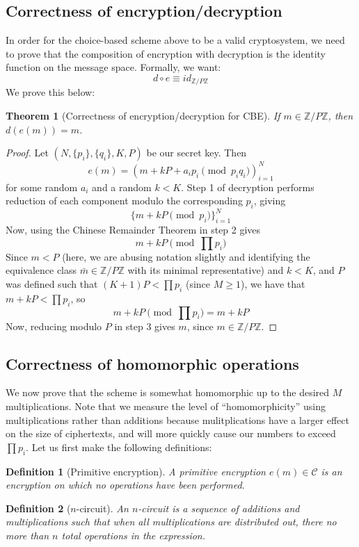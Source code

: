 \documentclass[11pt]{report}
\newtheorem{thm}{Theorem}
\newtheorem{definition}{Definition}
\newcommand{\ZP}{\mathbb{Z}/P\mathbb{Z}}
\begin{document}
\subsection{Correctness of encryption/decryption}

In order for the choice-based scheme above to be a valid cryptosystem, we need to prove that the composition of encryption with decryption is the identity function on the message space. Formally, we want: \[d\circ e \equiv id_{\ZP}\] We prove this below:

\begin{thm}[Correctness of encryption/decryption for CBE]
If $m\in\ZP$, then $d(e(m)) = m$.
\end{thm}

\begin{proof}
Let $(N,\{p_i\},\{q_i\},K,P)$ be our secret key. Then
\[e(m) = (m+kP+a_ip_i \pmod{p_iq_i})_{i=1}^N\]
for some random $a_i$ and a random $k<K$. Step 1 of decryption performs reduction of each component modulo the corresponding $p_i$, giving
\[\{m+kP \pmod{p_i}\}_{i=1}^N \]
Now, using the Chinese Remainder Theorem in step 2 gives
\[ m+kP \pmod{\prod p_i} \]
Since $m<P$ (here, we are abusing notation slightly and identifying the equivalence class $\bar{m} \in \ZP$ with its minimal representative) and $k<K$, and $P$ was defined such that $(K+1)P <\prod p_i$ (since $M\geq 1$), we have that $m+kP <\prod p_i$, so
\[ m+kP \pmod{\prod p_i} = m+kP\]
Now, reducing modulo $P$ in step 3 gives $m$, since $m\in \ZP$.
\end{proof}


\subsection{Correctness of homomorphic operations}

We now prove that the scheme is somewhat homomorphic up to the desired $M$ multiplications. Note that we measure the level of ``homomorphicity'' using multiplications rather than additions because mulitplications have a larger effect on the size of ciphertexts, and will more quickly cause our numbers to exceed $\prod p_i$. Let us first make the following definitions:

\begin{definition}[Primitive encryption]
A \emph{primitive encryption} $e(m) \in \mathcal{C}$ is an encryption on which no operations have been performed.
\end{definition}

\begin{definition}[$n$-circuit]
An \emph{$n$-circuit} is a sequence of additions and multiplications such that when all multiplications are distributed out, there no more than $n$ total operations in the expression.
\end{definition}
\end{document}
